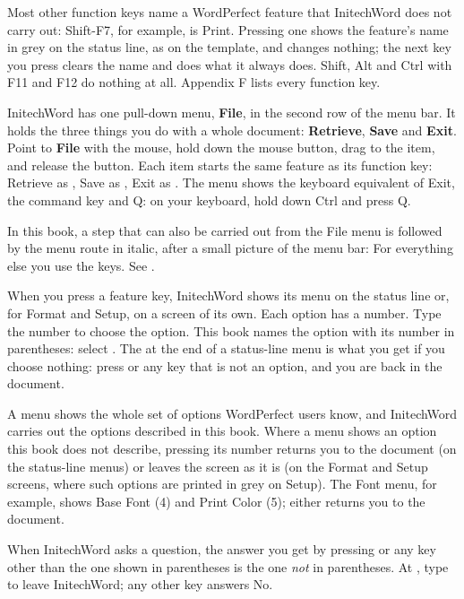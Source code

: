 Most other function keys name a WordPerfect feature that InitechWord does
not carry out: Shift-F7, for example, is Print.  Pressing one shows the
feature's name in grey on the status line, as on the template, and changes
nothing; the next key you press clears the name and does what it always
does.  Shift, Alt and Ctrl with F11 and F12 do nothing at all.  Appendix F
lists every function key.

InitechWord has one pull-down menu, \textbf{File}, in the second row of the
menu bar.  It holds the three things you do with a whole document:
\textbf{Retrieve}, \textbf{Save} and \textbf{Exit}.  Point to \textbf{File}
with the mouse, hold down the mouse button, drag to the item, and release
the button.  Each item starts the same feature as its function key:
Retrieve as , Save as , Exit as .  The menu shows
the keyboard equivalent of Exit, the command key and Q: on your keyboard,
hold down Ctrl and press Q.

In this book, a step that can also be carried out from the File menu is
followed by the menu route in italic, after a small picture of the menu bar:
For everything else you use the keys.  See .

When you press a feature key, InitechWord shows its menu on the status line
or, for Format and Setup, on a screen of its own.  Each option has a number.  Type
the number to choose the option.  This book names the option with its
number in parentheses: select .  The  at the end of a
status-line menu is what you get if you choose nothing: press  or
any key that is not an option, and you are back in the document.

A menu shows the whole set of options WordPerfect users know, and
InitechWord carries out the options described in this book.  Where a
menu shows an option this book does not describe, pressing its number
returns you to the document (on the status-line menus) or leaves the
screen as it is (on the Format and Setup screens, where such options are
printed in grey on Setup).  The Font menu, for example,
shows Base Font (4) and Print Color (5); either returns you to the
document.

When InitechWord asks a question, the answer you get by pressing
 or any key other than the one shown in parentheses is the one
\emph{not} in parentheses.  At , type  to
leave InitechWord; any other key answers No.

